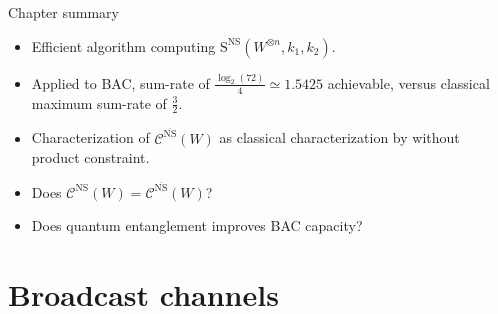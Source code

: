\documentclass{beamer}
\theoremstyle{definition}
\theoremstyle{remark}
\begin{document}
\begin{frame}{Chapter summary}
  \begin{itemize}
  \item Efficient algorithm computing $\mathrm{S}^{\mathrm{NS}}(W^{\otimes n},k_1,k_2)$.
  \item Applied to BAC, sum-rate of $\frac{\log_2(72)}{4} \simeq 1.5425$ achievable, versus classical maximum sum-rate of $\frac{3}{2}$.
    \pause
  \item Characterization of $\mathcal{C}^{\overline{\mathrm{NS}}}(W)$ as classical characterization by  \cite{Liao73,Ahlswede73} without product constraint.
    \pause
    \bigskip
  \item Does $\mathcal{C}^{\mathrm{NS}}(W)=\mathcal{C}^{\overline{\mathrm{NS}}}(W)$?
  \item Does quantum entanglement improves BAC capacity?
  \end{itemize}
\end{frame}

\section{Broadcast channels}
\end{document}
